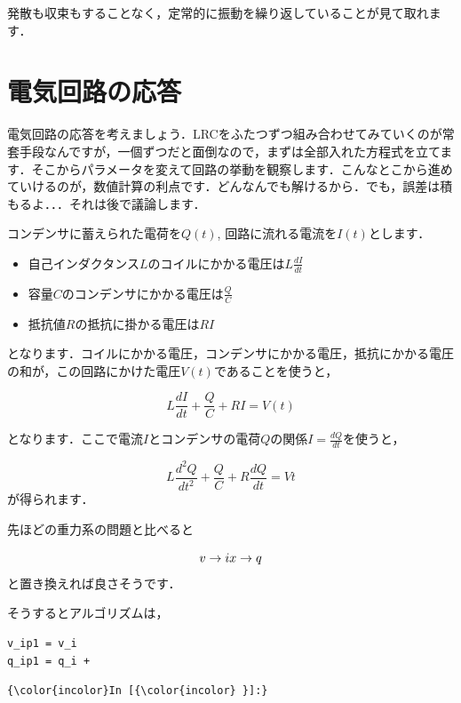 \documentclass[11pt,dvipdfmx]{jsarticle}
\providecommand{\tightlist}{%
      \setlength{\itemsep}{0pt}\setlength{\parskip}{0pt}}
\begin{document}
発散も収束もすることなく，定常的に振動を繰り返していることが見て取れます．

    \section{電気回路の応答}\label{ux96fbux6c17ux56deux8defux306eux5fdcux7b54}

電気回路の応答を考えましょう．LRCをふたつずつ組み合わせてみていくのが常套手段なんですが，一個ずつだと面倒なので，まずは全部入れた方程式を立てます．そこからパラメータを変えて回路の挙動を観察します．こんなとこから進めていけるのが，数値計算の利点です．どんなんでも解けるから．でも，誤差は積もるよ．．．それは後で議論します．

コンデンサに蓄えられた電荷を\(Q(t)\),
回路に流れる電流を\(I(t)\)とします．

\begin{itemize}
\tightlist
\item
  自己インダクタンス\(L\)のコイルにかかる電圧は\(L \frac{dI}{dt}\)
\item
  容量\(C\)のコンデンサにかかる電圧は\(\frac{Q}{C}\)
\item
  抵抗値\(R\)の抵抗に掛かる電圧は\(RI\)
\end{itemize}

となります．コイルにかかる電圧，コンデンサにかかる電圧，抵抗にかかる電圧の和が，この回路にかけた電圧\(V(t)\)であることを使うと，

\[
L \frac{dI}{dt} + \frac{Q}{C} + RI = V(t)
\]

となります．ここで電流\(I\)とコンデンサの電荷\(Q\)の関係\(I=\frac{dQ}{dt}\)を使うと，

\[
L \frac{d^2Q}{dt^2} + \frac{Q}{C} + R\frac{dQ}{dt} = V{t}
\] が得られます．

先ほどの重力系の問題と比べると

\[
v \rightarrow i \\
x \rightarrow q
\] と置き換えれば良さそうです．

そうするとアルゴリズムは，

\begin{verbatim}
v_ip1 = v_i 
q_ip1 = q_i + 
\end{verbatim}

    \begin{Verbatim}[commandchars=\\\{\}]
{\color{incolor}In [{\color{incolor} }]:} 
\end{Verbatim}



    
    
    
    
\end{document}

